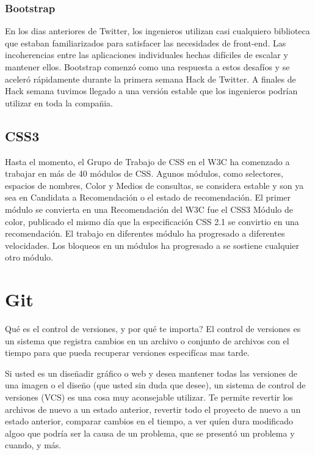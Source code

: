 \subsubsection{Bootstrap}

En los dias anteriores de Twitter, los ingenieros utilizan casi cualquiero biblioteca que estaban familiarizados para satisfacer
las necesidades de front-end. Las incoherencias entre las aplicaciones individuales hechas dif\'{i}ciles de escalar y mantener 
ellos. Bootstrap comenz\'{o} como una respuesta a estos desaf\'{i}os y se aceler\'{o} r\'{a}pidamente durante la primera semana
Hack de Twitter. A finales de Hack semana tuvimos llegado a una versi\'{o}n estable que los ingenieros podr\'{i}an utilizar en
toda la compa\"{n}ia.\cite{spurlock2013bootstrap}

\subsection{CSS3}

Hasta el momento, el Grupo de Trabajo de CSS en el W3C ha comenzado a trabajar en m\'{a}s de 40 m\'{o}dulos de CSS. Agunos 
m\'{o}dulos, como selectores, espacios de nombres, Color y Medios de consultas, se considera estable y son ya sea en Candidata
a Recomendaci\'{o}n o el estado de recomendaci\'{o}n. El primer m\'{o}dulo se convierta en una Recomendaci\'{o}n del W3C fue el
CSS3 M\'{o}dulo de color, publicado el mismo d\'{i}a que la especificaci\'{o}n CSS 2.1 se convirtio en una recomendaci\'{o}n.
El trabajo en diferentes m\'{o}dulo ha progresado a diferentes velocidades. Los bloqueos en un m\'{o}dulos ha progresado a se
sostiene cualquier otro m\'{o}dulo.\cite{spurlock2013bootstrap}

\section{Git}

\textquestiondown Qu\'{e} es el control de versiones, y por qu\'{e} te importa? El control de versiones es un sistema que registra cambios
en un archivo o conjunto de archivos con el tiempo para que pueda recuperar versiones especif\'{i}cas mas tarde.

Si usted es un dise\"{n}adir gr\'{a}fico o web y desea mantener todas las versiones de una imagen o el dise\"{n}o (que usted sin duda que desee), un sistema de control de versiones (VCS) es una cosa muy aconsejable utilizar. Te permite revertir los archivos de nuevo a un estado anterior, revertir todo el proyecto de nuevo a un estado anterior, comparar cambios en el tiempo, a ver qu\'{i}en dura modificado
algoo que podr\'{i}a ser la causa de un problema, que se present\'{o} un problema y cuando, y m\'{a}s.\cite{chacon2009pro}